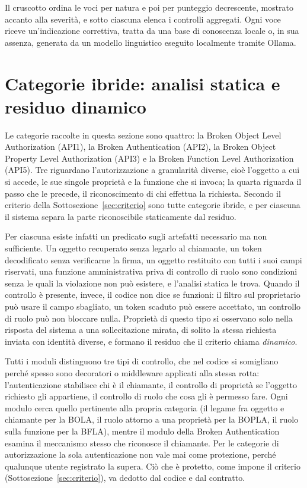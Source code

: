 Il cruscotto ordina le voci per natura e poi per punteggio decrescente,
mostrato accanto alla severità, e sotto ciascuna elenca i controlli
aggregati. Ogni voce riceve un'indicazione correttiva, tratta da una base di
conoscenza locale o, in sua assenza, generata da un modello linguistico
eseguito localmente tramite Ollama.

\section{Categorie ibride: analisi statica e residuo dinamico}
\label{sec:categorie-ibride}

Le categorie raccolte in questa sezione sono quattro: la Broken Object Level
Authorization (API1), la Broken Authentication (API2), la Broken Object
Property Level Authorization (API3) e la Broken Function Level Authorization
(API5). Tre riguardano l'autorizzazione a granularità diverse, cioè l'oggetto
a cui si accede, le sue singole proprietà e la funzione che si invoca; la
quarta riguarda il passo che le precede, il riconoscimento di chi effettua la
richiesta. Secondo il criterio della Sottosezione~\ref{sec:criterio} sono
tutte categorie ibride, e per ciascuna il sistema separa la parte
riconoscibile staticamente dal residuo.

Per ciascuna esiste infatti un predicato sugli artefatti necessario ma non
sufficiente. Un oggetto recuperato senza legarlo al chiamante, un token
decodificato senza verificarne la firma, un oggetto restituito con tutti i suoi
campi riservati, una funzione amministrativa priva di controllo di ruolo sono
condizioni senza le quali la violazione non può esistere, e l'analisi statica
le trova. Quando il controllo è presente, invece, il codice non dice se
funzioni: il filtro sul proprietario può usare il campo sbagliato, un token
scaduto può essere accettato, un controllo di ruolo può non bloccare nulla.
Proprietà di questo tipo si osservano solo nella risposta del sistema a una
sollecitazione mirata, di solito la stessa richiesta inviata con identità
diverse, e formano il residuo che il criterio chiama \emph{dinamico}.

Tutti i moduli distinguono tre tipi di controllo, che nel codice si somigliano
perché spesso sono decoratori o middleware applicati alla stessa rotta:
l'autenticazione stabilisce chi è il chiamante, il controllo di proprietà se
l'oggetto richiesto gli appartiene, il controllo di ruolo che cosa gli è
permesso fare. Ogni modulo cerca quello pertinente alla propria categoria (il
  legame fra oggetto e chiamante per la BOLA, il ruolo attorno a una proprietà
per la BOPLA, il ruolo sulla funzione per la BFLA), mentre il modulo della
Broken Authentication esamina il meccanismo stesso che riconosce il chiamante.
Per le categorie di autorizzazione la sola autenticazione non vale mai come
protezione, perché qualunque utente registrato la supera. Ciò che è protetto,
come impone il criterio (Sottosezione~\ref{sec:criterio}), va dedotto dal codice
e dal contratto.

